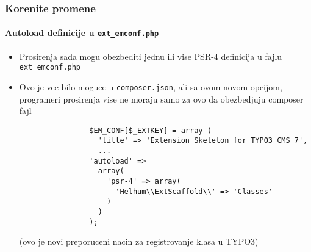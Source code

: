 \begin{frame}[fragile]
	\frametitle{Korenite promene}
	\framesubtitle{Autoload definicije u \texttt{ext\_emconf.php}}

	\lstset{basicstyle=\tiny\ttfamily}

	\begin{itemize}

		\item Prosirenja sada mogu obezbediti jednu ili vise PSR-4 definicija u fajlu \texttt{ext\_emconf.php}

		\item Ovo je vec bilo moguce u \texttt{composer.json}, ali sa ovom novom opcijom,
			programeri prosirenja vise ne moraju samo za ovo da obezbedjuju composer fajl

			\begin{lstlisting}
				$EM_CONF[$_EXTKEY] = array (
				  'title' => 'Extension Skeleton for TYPO3 CMS 7',
				  ...
				'autoload' =>
				  array(
				    'psr-4' => array(
				      'Helhum\\ExtScaffold\\' => 'Classes'
				    )
				  )
				);
			\end{lstlisting}

			\small
				(ovo je novi preporuceni nacin za registrovanje klasa u TYPO3)
			\normalsize

	\end{itemize}

\end{frame}


